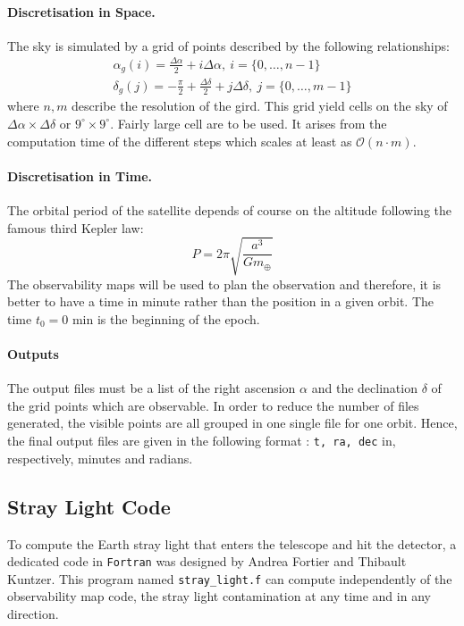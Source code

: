 \documentclass[a4paper,10pt]{article}
\begin{document}
\paragraph{Discretisation in Space.}
The sky is simulated by a grid of points described by the following relationships:
\begin{eqnarray}
\alpha_g(i) = \frac{\Delta \alpha}{2}+i\Delta\alpha,\ i=\{0,\dots,n-1\} \nonumber\\ %
\delta_g(j) = -\frac{\pi}{2} + \frac{\Delta \delta}{2}+j\Delta\delta,\ j=\{0,\dots,m-1\} %
\label{eq:grid}
\end{eqnarray}
where $n,m$ describe the resolution of the gird. This grid yield cells on the sky of $\Delta \alpha \times \Delta \delta$ or $9^\circ \times 9^\circ$. Fairly large cell are to be used. It arises from the computation time of the different steps which scales at least as $\mathcal{O}(n\cdot m)$.

\paragraph{Discretisation in Time.}
The orbital period of the satellite depends of course on the altitude following the famous third Kepler law:
$$ P = 2\pi \sqrt{\frac{a^3}{Gm_\oplus}} $$
The observability maps will be used to plan the observation and therefore, it is better to have a time in minute rather than the position in a given orbit. The time $t_0=0$ min is the beginning of the epoch.

\paragraph{Outputs} 
The output files must be a list of the right ascension $\alpha$ and the declination $\delta$ of the grid points which are observable. In order to reduce the number of files generated, the visible points are all grouped in one single file for one orbit. Hence, the final output files are given in the following format : \verb=t, ra, dec= in, respectively, minutes and radians.
\subsection{Stray Light Code} \label{numercis:stray_light.f}
To compute the Earth stray light that enters the telescope and hit the detector, a dedicated code in \verb=Fortran= was designed by Andrea Fortier and Thibault Kuntzer. This program named \verb=stray_light.f= can compute independently of the observability map code, the stray light contamination at any time and in any direction. 
\end{document}
